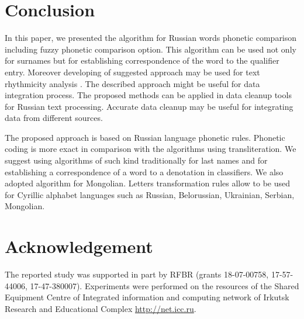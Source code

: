 \documentclass{svproc}
\begin{document}
\section{Conclusion}
In this paper, we presented the algorithm for Russian words phonetic comparison including fuzzy phonetic comparison option. This algorithm can be used not only for surnames but for establishing correspondence of the word to the qualifier entry. Moreover developing of suggested approach may be used for text rhythmicity analysis \cite{Damasevichius}. The described approach might be useful for data integration process. The proposed methods can be applied in data cleanup tools for Russian text processing. Accurate data cleanup may be useful for integrating data from different sources.

The proposed approach is based on Russian language phonetic rules. Phonetic coding is more exact in comparison with the algorithms using transliteration. We suggest using algorithms of such kind traditionally for last names and for establishing a correspondence of a word to a denotation in classifiers. We also adopted algorithm for Mongolian. Letters transformation rules allow to be used for Cyrillic alphabet languages such as Russian, Belorussian, Ukrainian, Serbian, Mongolian.



\section*{Acknowledgement}
The reported study was supported in part by RFBR (grants 18-07-00758, 17-57-44006, 17-47-380007). Experiments were performed on the resources of the Shared Equipment Centre of Integrated information and computing network of Irkutsk Research and Educational Complex \url{http://net.icc.ru}.
\end{document}
